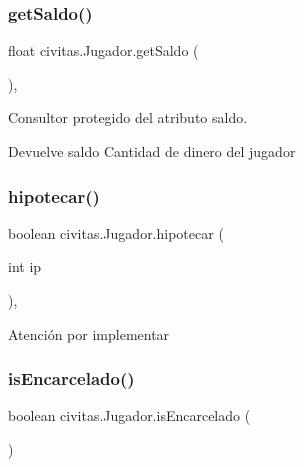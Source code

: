 \subsubsection{\texorpdfstring{get\+Saldo()}{getSaldo()}}
{\footnotesize\ttfamily float civitas.\+Jugador.\+get\+Saldo (\begin{DoxyParamCaption}{ }\end{DoxyParamCaption})\hspace{0.3cm}{\ttfamily [inline]}, {\ttfamily [protected]}}

Consultor protegido del atributo saldo. \begin{DoxyReturn}{Devuelve}
saldo Cantidad de dinero del jugador 
\end{DoxyReturn}
\mbox{\label{classcivitas_1_1Jugador_aad3e438212a101326c99e79c3c314f4b}} 
\subsubsection{\texorpdfstring{hipotecar()}{hipotecar()}}
{\footnotesize\ttfamily boolean civitas.\+Jugador.\+hipotecar (\begin{DoxyParamCaption}\item[{int}]{ip }\end{DoxyParamCaption})\hspace{0.3cm}{\ttfamily [inline]}, {\ttfamily [package]}}

\begin{DoxyWarning}{Atención}
por implementar 
\end{DoxyWarning}
\mbox{\label{classcivitas_1_1Jugador_a05547894205ba819363c25f40addecae}} 
\subsubsection{\texorpdfstring{is\+Encarcelado()}{isEncarcelado()}}
{\footnotesize\ttfamily boolean civitas.\+Jugador.\+is\+Encarcelado (\begin{DoxyParamCaption}{ }\end{DoxyParamCaption})\hspace{0.3cm}{\ttfamily [inline]}}


